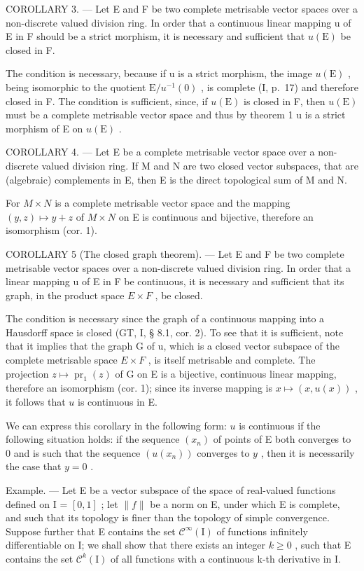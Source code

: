 COROLLARY 3. --- Let E and F be two complete metrisable vector spaces over a non-discrete valued division ring. In order that a continuous linear mapping u of E in F should be a strict morphism, it is necessary and sufficient that \(u(\mathrm{E})\) be closed in F.

The condition is necessary, because if u is a strict morphism, the image \(u(\mathrm{E})\) , being isomorphic to the quotient \(\mathrm{E}/u^{-1}(0)\) , is complete (I, p.~17) and therefore closed in F. The condition is sufficient, since, if \(u(\mathrm{E})\) is closed in F, then \(u(\mathrm{E})\) must be a complete metrisable vector space and thus by theorem 1 u is a strict morphism of E on \(u(\mathrm{E})\) .

COROLLARY 4. --- Let E be a complete metrisable vector space over a non-discrete valued division ring. If M and N are two closed vector subspaces, that are (algebraic) complements in E, then E is the direct topological sum of M and N.

For \(M \times N\) is a complete metrisable vector space and the mapping \((y, z) \mapsto y + z\) of \(M \times N\) on E is continuous and bijective, therefore an isomorphism (cor. 1).

COROLLARY 5 (The closed graph theorem). --- Let E and F be two complete metrisable vector spaces over a non-discrete valued division ring. In order that a linear mapping u of E in F be continuous, it is necessary and sufficient that its graph, in the product space \(E \times F\) , be closed.

The condition is necessary since the graph of a continuous mapping into a Hausdorff space is closed (GT, I, § 8.1, cor. 2). To see that it is sufficient, note that it implies that the graph G of u, which is a closed vector subspace of the complete metrisable space \(E \times F\) , is itself metrisable and complete. The projection \(z \mapsto \operatorname{pr}_{1}(z)\) of G on E is a bijective, continuous linear mapping, therefore an isomorphism (cor. 1); since its inverse mapping is \(x \mapsto (x, u(x))\) , it follows that \(u\) is continuous in E.

We can express this corollary in the following form: \(u\) is continuous if the following situation holds: if the sequence \((x_{n})\) of points of E both converges to 0 and is such that the sequence \((u(x_{n}))\) converges to \(y\) , then it is necessarily the case that \(y = 0\) .

Example. --- Let E be a vector subspace of the space of real-valued functions defined on I = \([0, 1]\) ; let \(\|f\|\) be a norm on E, under which E is complete, and such that its topology is finer than the topology of simple convergence. Suppose further that E contains the set \(\mathcal{C}^{\infty}(\mathrm{I})\) of functions infinitely differentiable on I; we shall show that there exists an integer \(k \geqslant 0\) , such that E contains the set \(\mathcal{C}^{k}(\mathrm{I})\) of all functions with a continuous k-th derivative in I.


